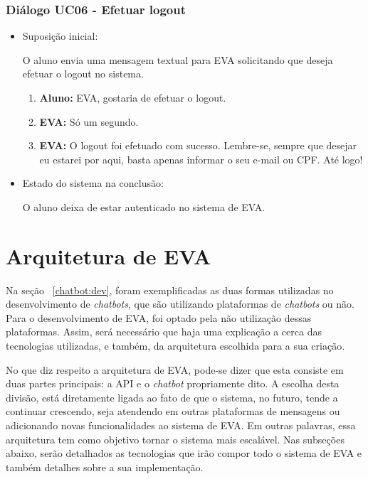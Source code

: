 \subsubsection{Diálogo UC06 - Efetuar logout}

\begin{itemize}
    \item Suposição inicial:
    
        O aluno envia uma mensagem textual para EVA solicitando que deseja efetuar o logout no sistema.
        
        \begin{enumerate}
            \item \textbf{Aluno:} EVA, gostaria de efetuar o logout.
            \item \textbf{EVA:} Só um segundo.
            \item \textbf{EVA:} O logout foi efetuado com sucesso. Lembre-se, sempre que desejar eu estarei por aqui, basta apenas informar o seu e-mail ou CPF. Até logo!
        \end{enumerate}
    
    \item Estado do sistema na conclusão:
    
        O aluno deixa de estar autenticado no sistema de EVA.
\end{itemize}


\section{Arquitetura de EVA}

Na seção ~\ref{chatbot:dev}, foram exemplificadas as duas formas utilizadas no desenvolvimento de \textit{chatbots}, que são utilizando plataformas de \textit{chatbots} ou não. Para o desenvolvimento de EVA, foi optado pela não utilização dessas plataformas. Assim, será necessário que haja uma explicação a cerca das tecnologias utilizadas, e também, da arquitetura escolhida para a sua criação.

No que diz respeito a arquitetura de EVA, pode-se dizer que esta consiste em duas partes principais: a API e o \textit{chatbot} propriamente dito. A escolha desta divisão, está diretamente ligada ao fato de que o sistema, no futuro, tende a continuar crescendo, seja atendendo em outras plataformas de mensagens ou adicionando novas funcionalidades ao sistema de EVA. Em outras palavras, essa arquitetura tem como objetivo tornar o sistema mais escalável. Nas subseções abaixo, serão detalhados as tecnologias que irão compor todo o sistema de EVA e também detalhes sobre a sua implementação.

